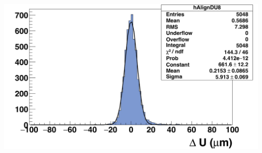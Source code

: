 \documentclass{beamer}
\begin{document}
\begin{frame}
\begin{center}
\begin{columns}[t]
\begin{column}{4cm}
          \
          \includegraphics[width = 1.2\textwidth]{Pictures/deltaU_8_corrected1.png}
        \end{column}
      \end{columns}
    \end{center}
  
    \vspace{-0.35cm}
  
    \vspace{-0.15cm}
  \end{frame}

\end{document}
